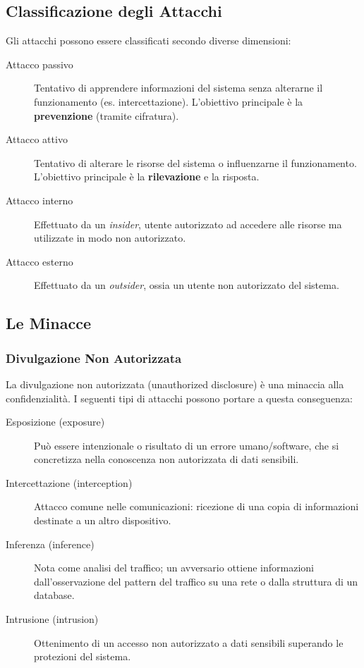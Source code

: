 \subsection{Classificazione degli Attacchi}

Gli attacchi possono essere classificati secondo diverse dimensioni:

\begin{description}
    \item[Attacco passivo] Tentativo di apprendere informazioni del sistema senza alterarne il funzionamento (es. intercettazione). L'obiettivo principale è la \textbf{prevenzione} (tramite cifratura).
    \item[Attacco attivo] Tentativo di alterare le risorse del sistema o influenzarne il funzionamento. L'obiettivo principale è la \textbf{rilevazione} e la risposta.
    \item[Attacco interno] Effettuato da un \textit{insider}, utente autorizzato ad accedere alle risorse ma utilizzate in modo non autorizzato.
    \item[Attacco esterno] Effettuato da un \textit{outsider}, ossia un utente non autorizzato del sistema.
\end{description}

\subsection{Le Minacce}

\subsubsection{Divulgazione Non Autorizzata}
La divulgazione non autorizzata (unauthorized disclosure) è una minaccia alla confidenzialità. I seguenti tipi di attacchi possono portare a questa conseguenza:
\begin{description}
    \item[Esposizione (exposure)] Può essere intenzionale o risultato di un errore umano/software, che si concretizza nella conoscenza non autorizzata di dati sensibili.
    \item[Intercettazione (interception)] Attacco comune nelle comunicazioni: ricezione di una copia di informazioni destinate a un altro dispositivo.
    \item[Inferenza (inference)] Nota come analisi del traffico; un avversario ottiene informazioni dall'osservazione del pattern del traffico su una rete o dalla struttura di un database.
    \item[Intrusione (intrusion)] Ottenimento di un accesso non autorizzato a dati sensibili superando le protezioni del sistema.
\end{description}

